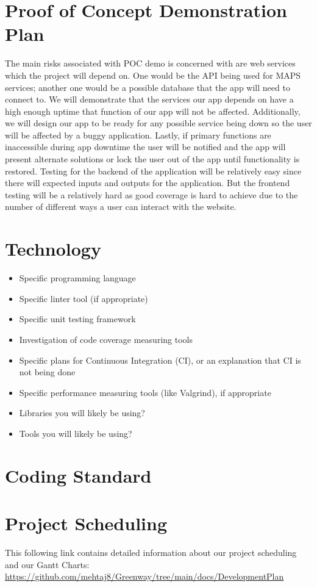 \documentclass{article}
\begin{document}
\section{Proof of Concept Demonstration Plan}

The main risks associated with POC demo is concerned with are web services which the project will 
depend on. One would be the API being used for MAPS services; another one would be a possible database 
that the app will need to connect to. We will demonstrate that the services our app depends on have a 
high enough uptime that function of our app will not be affected. Additionally, we will design our app 
to be ready for any possible service being down so the user will be affected by a buggy application. Lastly, 
if primary functions are inaccessible during app downtime the user will be notified and the app will present 
alternate solutions or lock the user out of the app until functionality is restored. Testing for the backend 
of the application will be relatively easy since there will expected inputs and outputs for the application. 
But the frontend testing will be a relatively hard as good coverage is hard to achieve due to the number of 
different ways a user can interact with the website. 

\section{Technology}

\begin{itemize}
\item Specific programming language
\item Specific linter tool (if appropriate)
\item Specific unit testing framework
\item Investigation of code coverage measuring tools
\item Specific plans for Continuous Integration (CI), or an explanation that CI
  is not being done
\item Specific performance measuring tools (like Valgrind), if
  appropriate
\item Libraries you will likely be using?
\item Tools you will likely be using?
\end{itemize}

\section{Coding Standard}

\section{Project Scheduling}
This following link contains detailed information about our project scheduling and our Gantt Charts:\\
\url{https://github.com/mehtaj8/Greenway/tree/main/docs/DevelopmentPlan}
\end{document}
